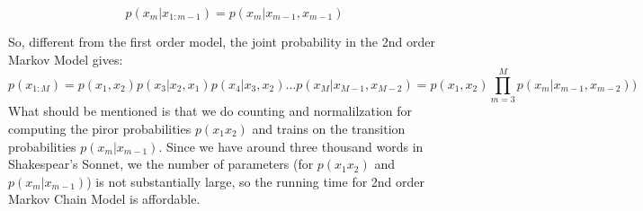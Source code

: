 \begin{equation}
  p(x_m|x_{1:m-1}) = p(x_m|x_{m-1}, x_{m-1})
\end{equation}

So, different from the first order model, the joint probability in the 2nd order Markov Model gives:
\begin{equation}
  p(x_{1:M}) =p(x_1, x_2)p(x_3|x_2, x_1)p(x_4|x_3, x_2) ...  p(x_M|x_{M-1}, x_{M-2}) = p(x_1, x_2) \prod\limits_{m=3}^M p(x_m|x_{m-1}, x_{m-2}))
\end{equation} 
What should be mentioned is that we do counting and normalilzation for computing the piror probabilities $p(x_1 x_2)$ and trains on the transition probabilities $p(x_m|x_{m-1})$. Since we have around three thousand words in Shakespear's Sonnet, we the number of parameters (for $p(x_1 x_2)$ and $p(x_m|x_{m-1})$) is not substantially large, so the running time for 2nd order Markov Chain Model is affordable.
